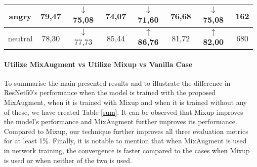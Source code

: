 \documentclass[10pt,twocolumn,letterpaper]{article}
\begin{document}
\begin{table*}[t]
{\begin{tabular}{c|cc|cc|cc|c}
angry                     & \multicolumn{1}{c}{79,47}  & $\downarrow$ 75,08     & \multicolumn{1}{c}{74,07} & $\downarrow$ 71,60    & \multicolumn{1}{c}{76,68}  & $\downarrow$ 
75,08    & 162              \\ \hline
neutral                   & \multicolumn{1}{c}{78,30}  & $\downarrow$ 77,73     & \multicolumn{1}{c}{85,44} & $\uparrow$ \textbf{86,76}    & \multicolumn{1}{c}{81,72}  & $\uparrow$ \textbf{82,00}    & 680              \\ \hline 
\end{tabular}}
\label{tab:classes}
\end{table*}



















\paragraph{Utilize MixAugment vs Utilize Mixup vs Vanilla Case}  To summarise the main presented results and to illustrate the difference in ResNet50's performance when the model is trained with the proposed MixAugment, when it is trained with Mixup and when it is trained without any of these, we have created Table \ref{sum}. It can be observed that Mixup improves the model's performance and MixAugment further improves its performance. Compared to Mixup, our technique further improves all three evaluation metrics for at least 1\%. Finally, it is notable to mention that when MixAugment is used in network training, the convergence is faster compared to the cases when Mixup is used or when neither of the two is used. 




\begin{table}[h!]
\setlength{\tabcolsep}{8pt}
\caption{ResNet50 trained with MixAugment, with Mixup and without any of the two}
\label{sum}
\centering
{}
\end{table} 
\end{document}
